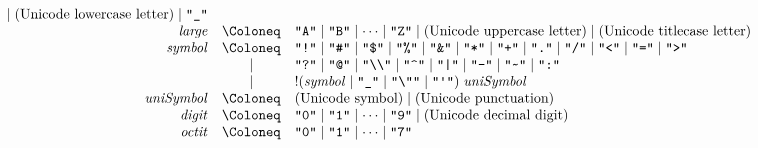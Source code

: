 \begin{align*}
\begin{array}{rcl}
    \mid (\text{Unicode lowercase letter})
    \mid \text{\texttt{\textquotedbl\textunderscore\textquotedbl}}
    \\
    \mathit{large}
    & \Coloneq & \text{\texttt{\textquotedbl A\textquotedbl}} \mid \text{\texttt{\textquotedbl B\textquotedbl}} \mid \cdots \mid \text{\texttt{\textquotedbl Z\textquotedbl}}
    \mid (\text{Unicode uppercase letter})
    \mid (\text{Unicode titlecase letter})
    \\
    \mathit{symbol}
    & \Coloneq & \text{\texttt{\textquotedbl!\textquotedbl}}
    \mid \text{\texttt{\textquotedbl\#\textquotedbl}}
    \mid \text{\texttt{\textquotedbl\$\textquotedbl}}
    \mid \text{\texttt{\textquotedbl\%\textquotedbl}}
    \mid \text{\texttt{\textquotedbl\&\textquotedbl}}
    \mid \text{\texttt{\textquotedbl *\textquotedbl}}
    \mid \text{\texttt{\textquotedbl +\textquotedbl}}
    \mid \text{\texttt{\textquotedbl .\textquotedbl}}
    \mid \text{\texttt{\textquotedbl /\textquotedbl}}
    \mid \text{\texttt{\textquotedbl <\textquotedbl}}
    \mid \text{\texttt{\textquotedbl =\textquotedbl}}
    \mid \text{\texttt{\textquotedbl >\textquotedbl}}
    \\
    & \mid & \text{\texttt{\textquotedbl ?\textquotedbl}}
    \mid \text{\texttt{\textquotedbl @\textquotedbl}}
    \mid \text{\texttt{\textquotedbl\textbackslash\textbackslash\textquotedbl}}
    \mid \text{\texttt{\textquotedbl\textasciicircum\textquotedbl}}
    \mid \text{\texttt{\textquotedbl |\textquotedbl}}
    \mid \text{\texttt{\textquotedbl -\textquotedbl}}
    \mid \text{\texttt{\textquotedbl\textasciitilde\textquotedbl}}
    \mid \text{\texttt{\textquotedbl :\textquotedbl}}
    \\
    & \mid & ! (\mathit{symbol} \mid \text{\texttt{\textquotedbl\textunderscore\textquotedbl}} \mid \text{\texttt{\textquotedbl\textbackslash\textquotedbl\textquotedbl}} \mid \text{\texttt{\textquotedbl\textquotesingle\textquotedbl}})\; \mathit{uniSymbol}
    \\
    \mathit{uniSymbol}
    & \Coloneq & (\text{Unicode symbol})
    \mid (\text{Unicode punctuation})
    \\
    \mathit{digit}
    & \Coloneq & \text{\texttt{\textquotedbl0\textquotedbl}} \mid \text{\texttt{\textquotedbl1\textquotedbl}} \mid \cdots \mid \text{\texttt{\textquotedbl9\textquotedbl}}
    \mid (\text{Unicode decimal digit})
    \\
    \mathit{octit}
    & \Coloneq & \text{\texttt{\textquotedbl0\textquotedbl}} \mid \text{\texttt{\textquotedbl1\textquotedbl}} \mid \cdots \mid \text{\texttt{\textquotedbl7\textquotedbl}}

\end{array}
\end{align*}
